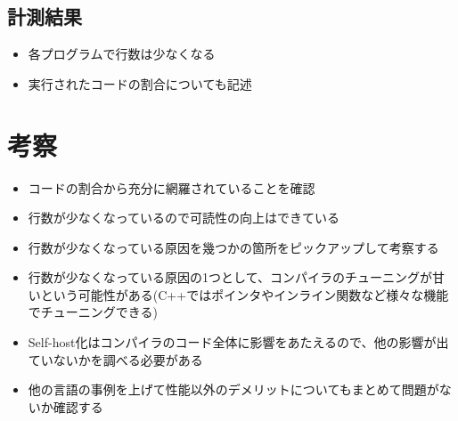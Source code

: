 \subsection{計測結果}

\begin{itemize}
    \item 各プログラムで行数は少なくなる
    \item 実行されたコードの割合についても記述
\end{itemize}

\section{考察}
\label{readability:discussion}

\begin{itemize}
    \item コードの割合から充分に網羅されていることを確認
    \item 行数が少なくなっているので可読性の向上はできている
    \item 行数が少なくなっている原因を幾つかの箇所をピックアップして考察する
    \item 行数が少なくなっている原因の1つとして、コンパイラのチューニングが甘いという可能性がある(C++ではポインタやインライン関数など様々な機能でチューニングできる)
    \item Self-host化はコンパイラのコード全体に影響をあたえるので、他の影響が出ていないかを調べる必要がある
    \item 他の言語の事例を上げて性能以外のデメリットについてもまとめて問題がないか確認する
\end{itemize}

